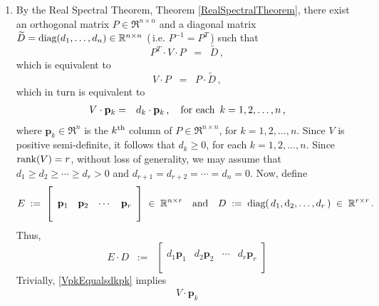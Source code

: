 \newpage
\proof
\begin{enumerate}
\item
	By the Real Spectral Theorem, Theorem \ref{RealSpectralTheorem},
	there exist an orthogonal matrix $P \in \Re^{n \times n}$ and a diagonal matrix
	$\widetilde{D} = \textnormal{diag}(d_{1},\ldots,d_{n}) \in \mathbb{R}^{n \times n}$ (\,i.e. $P^{-1} = P^{T}$\,)
	such that
	\begin{equation*}
	P^{T} \cdot V \cdot P \;\; = \;\; \widetilde{D}\,,
	\end{equation*}
	which is equivalent to
	\begin{equation*}
	V \cdot P \;\; = \;\; P \cdot \widetilde{D}\,,
	\end{equation*}
	which in turn is equivalent to
	\begin{eqnarray}
	\label{VpkEqualsdkpk}
	V \cdot \mathbf{p}_{k}
	& = & 
		d_{k} \cdot \mathbf{p}_{k}\,,
	\quad
	\textnormal{for each \,$k = 1,2,\ldots,n$}\,,
	\end{eqnarray}
	where $\mathbf{p}_{k} \in \Re^{n}$ is the $k^{\textnormal{th}}$ column of $P \in \Re^{n \times n}$,
	for $k = 1, 2, \ldots, n$.
	Since $V$ is positive semi-definite, it follows that $d_{k} \geq 0$, for each $k = 1,2,\ldots,n$.
	Since $\textnormal{rank}(V) = r$, without loss of generality, we may assume that
	$d_{1} \geq d_{2} \geq \cdots \geq d_{r} > 0$ and $d_{r+1} = d_{r+2} = \cdots = d_{n} = 0$.
	Now, define
	\begin{equation*}
	E \; := \; \left[\begin{array}{cccc} \\ \mathbf{p}_{1} & \mathbf{p}_{2} & \cdots & \mathbf{p}_{r} \\ \\ \end{array}\right]
	\; \in \; \mathbb{R}^{n \times r}
	\quad\textnormal{and}\quad
	D \; := \; \textnormal{diag}(\,d_{1},\textnormal{d}_{2},\ldots,d_{r}\,) \; \in \; \mathbb{R}^{r \times r}\,.
	\end{equation*}
	Thus,
	\begin{equation*}
	E \cdot D
	\;\; := \;\;
		\left[\begin{array}{cccc}
			\\
			d_{1}\mathbf{p}_{1} & d_{2}\mathbf{p}_{2} & \cdots & d_{r}\mathbf{p}_{r} \\
			\\
		\end{array}\right]
	\end{equation*}
	Trivially, \eqref{VpkEqualsdkpk} implies
	\begin{eqnarray*}
	V \cdot \mathbf{p}_{k}

\end{eqnarray*}
\end{enumerate}
